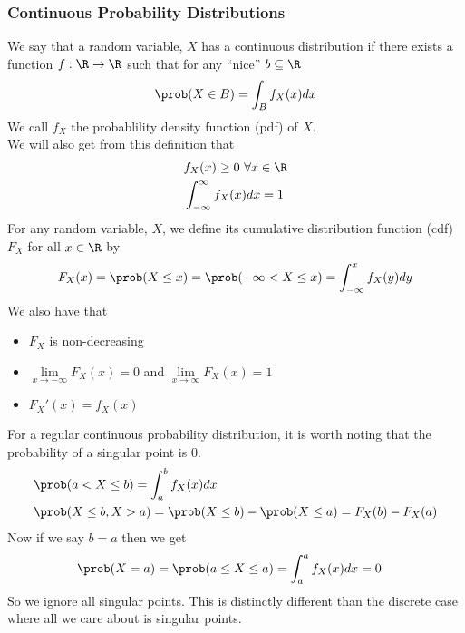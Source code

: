 \subsubsection{Continuous Probability Distributions}
We say that a random variable, $X$ has a continuous distribution if there exists a function $f:\R\to\R$ such that for any ``nice'' $b\subseteq\R$
\[\prob(X\in B)=\int_B f_X(x)dx\]
We call $f_X$ the probablility density function (pdf) of $X$.\\
We will also get from this definition that
\begin{align*}
    &f_X(x)\geq 0\ \forall x\in\R\\
    &\int_{-\infty}^\infty f_X(x)dx=1
\end{align*}
For any random variable, $X$, we define its cumulative distribution function (cdf) $F_X$ for all $x\in \R$ by
\[F_X(x)=\prob(X\leq x)=\prob(-\infty<X\leq x)=\int_{-\infty}^xf_X(y)dy\]
We also have that
\begin{itemize}
    \item $F_X$ is non-decreasing
    \item $\lim\limits_{x\to-\infty}F_X(x)=0$ and $\lim\limits_{x\to\infty} F_X(x)=1$
    \item $F_X'(x)=f_X(x)$
\end{itemize}
For a regular continuous probability distribution, it is worth noting that the probability of a singular point is 0.
\begin{align*}
    &\prob(a<X\leq b)=\int_a^b f_X(x)dx\\
    &\prob(X\leq b,X>a)=\prob(X\leq b)-\prob(X\leq a)=F_X(b)-F_X(a)
\end{align*}
Now if we say $b=a$ then we get
\begin{align*}
    &\prob(X=a)=\prob(a\leq X\leq a)=\int_a^a f_X(x)dx=0
\end{align*}
So we ignore all singular points. This is distinctly different than the discrete case where all we care about is singular points.

